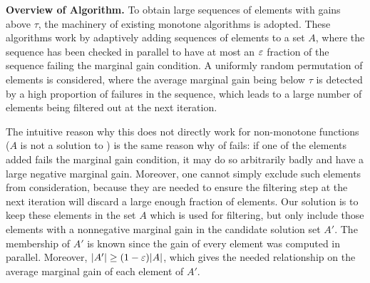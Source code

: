 \textbf{Overview of Algorithm.}
To obtain large sequences of elements with gains above
$\tau$, the machinery of existing monotone algorithms
\cite{Kazemi2019,chen2021best} is adopted.
These algorithms work by adaptively adding sequences of elements
to a set $A$, where the sequence has been checked in parallel
to have at most an $\varepsilon$ fraction of the sequence
failing the marginal gain condition.
A uniformly 
random permutation of elements is considered,
where the average marginal
gain being below $\tau$ is detected by a high proportion
of failures in the sequence, which leads to a large number
of elements being filtered out at the next iteration. 


The intuitive reason why this does not directly work for non-monotone
functions (\ie $A$ is not
a solution to \tp) is the same reason 
why \thresam of  fails:
if one of the elements added fails the marginal gain
condition, it may do so arbitrarily badly and have a large
negative marginal gain.
Moreover, one cannot
simply exclude such elements from consideration, because they
are needed to ensure the filtering step at the next iteration will
discard a large enough fraction of elements. Our solution is to
keep these elements in the set $A$ which is used for filtering,
but only include those elements
with a nonnegative marginal gain in the candidate solution set
$A'$. The membership of $A'$ is known since the gain of every element
was computed in parallel. Moreover, $|A'| \ge (1 - \varepsilon)|A|$, which
gives the needed relationship on the average marginal gain of each element
of $A'$. 



